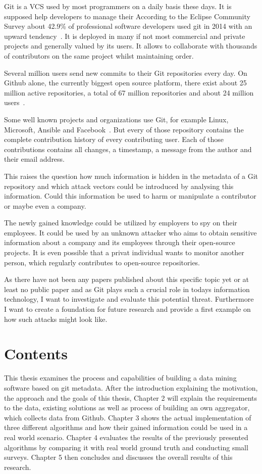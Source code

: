 Git is a \ac{VCS} used by most programmers on a daily basis these days.
It is supposed help developers to manage their
According to the Eclipse Community Survey about 42.9\% of professional software developers used git in 2014 with an upward tendency~\cite{article:git-popularity}.
It is deployed in many if not most commercial and private projects and generally valued by its users.
It allows to collaborate with thousands of contributors on the same project whilst maintaining order.

Several million users send new commits to their Git repositories every day.
On Github alone, the currently biggest open source platform, there exist about 25 million active repositories, a total of 67 million repositories and about 24 million users~\cite{article:github-statistics}.

Some well known projects and organizations use Git, for example Linux, Microsoft, Ansible and Facebook~\cite{article:github-statistics}.
But every of those repository contains the complete contribution history of every contributing user.
Each of those contributions contains all changes, a timestamp, a message from the author and their email address.

This raises the question how much information is hidden in the metadata of a Git repository and which attack vectors could be introduced by analysing this information.
Could this information be used to harm or manipulate a contributor or maybe even a company.

The newly gained knowledge could be utilized by employers to spy on their employees.
It could be used by an unknown attacker who aims to obtain sensitive information about a company and its employees through their open-source projects.
It is even possible that a privat individual wants to monitor another person, which regularly contributes to open-source repositories.

As there have not been any papers published about this specific topic yet or at least no public paper and as Git plays such a crucial role in todays information technology, I want to investigate and evaluate this potential threat.
Furthermore I want to create a foundation for future research and provide a first example on how such attacks might look like.

\section{Contents}
This thesis examines the process and capabilities of building a data mining software based on git metadata.
After the introduction explaining the motivation, the approach and the goals of this thesis, Chapter 2 will explain the requirements to the data, existing solutions as well as process of building an own aggregator, which collects data from Github.
Chapter 3 shows the actual implementation of three different algorithms and how their gained information could be used in a real world scenario.
Chapter 4 evaluates the results of the previously presented algorithms by comparing it with real world ground truth and conducting small surveys.
Chapter 5 then concludes and discusses the overall results of this research.

